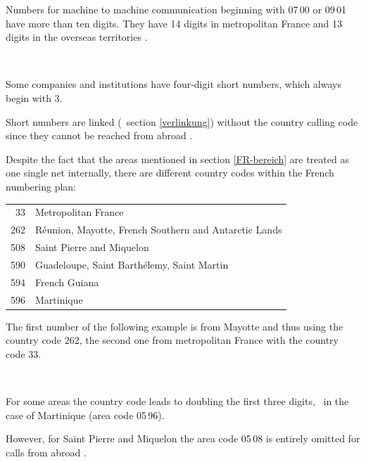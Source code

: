 \documentclass[numbers=noenddot]{scrreprt}
\newcommand*\vglAbschnitt[1]{(\cf\ section \ref{#1})}
\begin{document}
Numbers for machine to machine communication beginning with 07\,00 or 09\,01 have more than ten digits. They have 14 digits in metropolitan France and 13 digits in the overseas territories \cite[17, 24]{ARCEP}.
\begin{sidebyside}
   \\
\end{sidebyside}

Some companies and institutions have four-digit short numbers, which always begin with 3.
\begin{sidebyside}
\end{sidebyside}
Short numbers are linked
\vglAbschnitt{verlinkung} without the country calling code since they cannot be reached from abroad \cite[29]{ARCEP}.

Despite the fact that the areas mentioned in section \ref{FR-bereich} are treated as one single net internally, there are different country codes within the French numbering plan:
\begin{center}
\begin{tabular}{rl}
33 & Metropolitan France \\
262 & R\'eunion, Mayotte, French Southern and Antarctic Lands \\
508 & Saint Pierre and Miquelon \\
590 & Guadeloupe, Saint Barth\'elemy, Saint Martin \\
594 & French Guiana \\
596 & Martinique \\
\end{tabular}
\end{center}
The first number of the following example is from Mayotte and thus using the country code 262, the second one from metropolitan France with the country code 33.
\begin{sidebyside}
   \\
\end{sidebyside}

For some areas the country code leads to doubling the first three digits, \eg\ in the case of Martinique (area code 05\,96).
\begin{sidebyside}
\end{sidebyside}
However, for Saint Pierre and Miquelon the area code 05\,08 is entirely omitted for calls from abroad \cite[12]{ARCEP}.
\begin{sidebyside}
\end{sidebyside}
\end{document}
